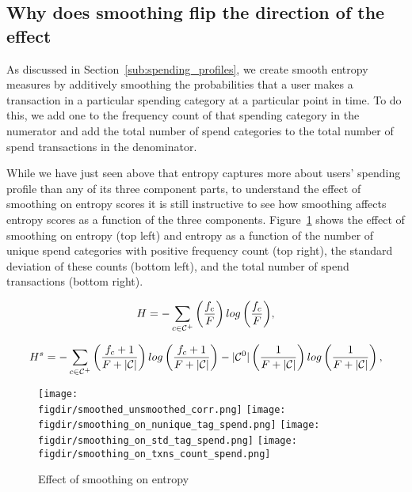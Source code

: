 \subsection{Why does smoothing flip the direction of the effect}%
\label{sub:why_does_smoothing_flip_the_direction_of_the_effect}

As discussed in Section~\ref{sub:spending_profiles}, we create smooth entropy
measures by additively smoothing the probabilities that a user makes a
transaction in a particular spending category at a particular point in time. To
do this, we add one to the frequency count of that spending category in the
numerator and add the total number of spend categories to the total number of
spend transactions in the denominator.

While we have just seen above that entropy captures more about users' spending
profile than any of its three component parts, to understand the effect of
smoothing on entropy scores it is still instructive to see how smoothing
affects entropy scores as a function of the three components.
Figure~\ref{fig:effect_of_smoothing} shows the effect of smoothing on entropy
(top left) and entropy as a function of the number of unique spend categories
with positive frequency count (top right), the standard deviation of these
counts (bottom left), and the total number of spend transactions (bottom
right).

\newpage

\begin{equation}
\label{equ:entropy_us}
H = -\sum_{c \in \mathcal{C}^{+}}{\left(\frac{f_c}{F}\right)
log\left(\frac{f_c}{F}\right)},
\end{equation}

\begin{equation}
\label{equ:entropy_s}
H^s = -\sum_{c \in \mathcal{C}^{+}}{\left(\frac{f_c + 1}{F + |\mathcal{C}|}\right)
log\left(\frac{f_c + 1}{F + |\mathcal{C}|}\right)}
- |\mathcal{C}^{0}|\left(\frac{1}{F + |\mathcal{C}|}\right)
log\left(\frac{1}{F + |\mathcal{C}|}\right),
\end{equation}



\begin{figure}[h]
    \centering 
    \caption{Effect of smoothing on entropy}
    \label{fig:effect_of_smoothing}
    \texttt{[image: \\figdir/smoothed\_unsmoothed\_corr.png]}
    \texttt{[image: \\figdir/smoothing\_on\_nunique\_tag\_spend.png]}
    \texttt{[image: \\figdir/smoothing\_on\_std\_tag\_spend.png]}
    \texttt{[image: \\figdir/smoothing\_on\_txns\_count\_spend.png]}
\end{figure}


